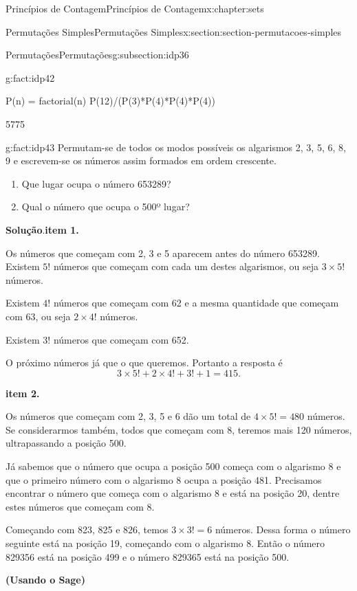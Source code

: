 \documentclass[oneside,10pt,]{book}
\newcommand{\blocktitlefont}{\relax}
\newcommand{\terminology}[1]{\textbf{#1}}
\numberwithin{equation}{section}
\begin{document}
\begin{chapterptx}{Princípios de Contagem}{}{Princípios de Contagem}{}{}{x:chapter:sets}
\begin{sectionptx}{Permutações Simples}{}{Permutações Simples}{}{}{x:section:section-permutacoes-simples}
\begin{subsectionptx}{Permutações}{}{Permutações}{}{}{g:subsection:idp36}
\begin{fact}{}{}{g:fact:idp42}
%
\begin{sageinput}
P(n) = factorial(n)
P(12)/(P(3)*P(4)*P(4)*P(4))
\end{sageinput}
\begin{sageoutput}
5775
\end{sageoutput}
\end{fact}
\begin{fact}{}{}{g:fact:idp43}%
Permutam-se de todos os modos possíveis os algarismos 2, 3, 5, 6, 8, 9 e escrevem-se os números assim formados em ordem crescente.%
%
\begin{enumerate}
\item{}Que lugar ocupa o número 653289?%
\item{}Qual o número que ocupa o 500º lugar?%
\end{enumerate}
\textbf{\blocktitlefont Solução}.\quad{}\terminology{item 1.}%
\par
Os números que começam com 2, 3 e 5 aparecem antes do número 653289. Existem \(5!\) números que começam com cada um destes algarismos, ou seja \(3\times 5!\) números.%
\par
Existem \(4!\) números que começam com 62 e a mesma quantidade que começam com 63, ou seja \(2\times 4!\) números.%
\par
Existem \(3!\) números que começam com 652.%
\par
O próximo números já que o que queremos. Portanto a resposta é%
\begin{equation*}
3\times 5! + 2\times 4! +3! +1 = 415.
\end{equation*}
%
\par
\terminology{item 2.}%
\par
Os números que começam com 2, 3, 5 e 6 dão um total de \(4\times 5! = 480\) números. Se considerarmos também, todos que começam com 8, teremos mais 120 números, ultrapassando a posição 500.%
\par
Já sabemos que o número que ocupa a posição 500 começa com o algarismo 8 e que o primeiro número com o algarismo 8 ocupa a posição 481. Precisamos encontrar o número que começa com o algarismo 8 e está na posição 20, dentre estes números que começam com 8.%
\par
Começando com 823, 825 e 826, temos \(3\times 3! = 6\) números. Dessa forma o número seguinte está na posição 19, começando com o algarismo 8. Então o número 829356 está na posição 499 e o número 829365 está na posição 500.%
\par
\terminology{(Usando o Sage)}%
\par

\end{fact}
\end{subsectionptx}
\end{sectionptx}
\end{chapterptx}
\end{document}
